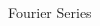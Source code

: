 \begin{frame}[t]{Fourier Series}
\begin{center}
{\begin{columns}[t, onlytextwidth]
\begin{column}{0.5\textwidth}
                \end{column}\begin{column}{0.5\textwidth}
                    \centering{}

\end{column}
\end{columns}}
\end{center}
\end{frame}
